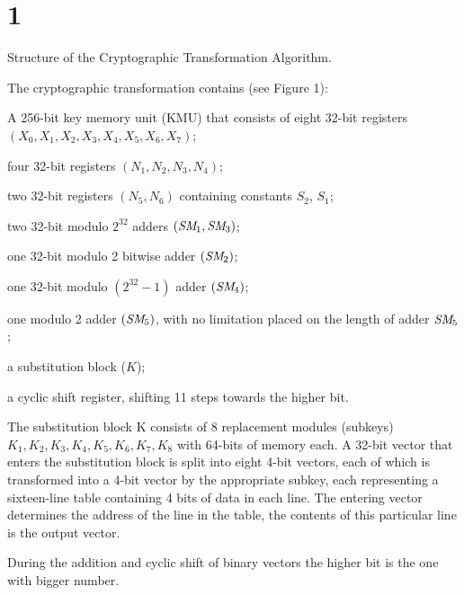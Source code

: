 \par\vfill\supereject

\section{1}{Structure of the Cryptographic Transformation Algorithm.}

The cryptographic transformation contains (see Figure 1): \par

     A 256-bit key memory unit (KMU) that consists of eight 32-bit
registers $(X_0, X_1, X_2, X_3, X_4, X_5, X_6, X_7)$; \par

     four 32-bit registers $(N_1, N_2, N_3, N_4)$; \par

%

     two 32-bit registers $(N_5, N_6)$ containing constants $S_2$, $S_1$; \par

     two 32-bit modulo $2^{32}$ adders $({\it SM\!}_1, {\it SM\!}_3)$; \par

     one 32-bit modulo 2 bitwise adder $({\it SM\!}_2)$; \par

     one 32-bit modulo $(2^{32}-1)$ adder $({\it SM\!}_4)$; \par

     one modulo 2 adder $({\it SM\!}_5)$, with no limitation placed on the length
of adder ${\it SM\!}_5$; \par

     a substitution block ($K$); \par

     a cyclic shift register, shifting  11 steps towards the higher bit.

The substitution block K consists of 8 replacement modules
(subkeys) $K_1, K_2, K_3, K_4, K_5, K_6, K_7, K_8$ with 64-bits of memory each.
A 32-bit vector that enters the substitution block is split into eight
4-bit vectors, each of which is transformed into a 4-bit
vector by the appropriate subkey, each representing a sixteen-line
table containing 4 bits of data in each line.  The entering vector
determines the address of the line in the table, the contents of
this particular line is the output vector.

During the addition and cyclic shift of binary vectors
the higher bit is the one with bigger number.

